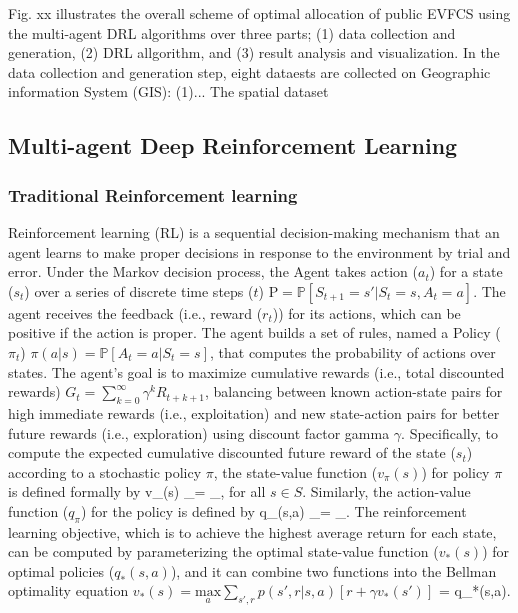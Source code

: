 \documentclass[preprint,12pt]{elsarticle}
\begin{document}
\vspace{5pt}

Fig. xx illustrates the overall scheme of optimal allocation of public EVFCS using the multi-agent DRL algorithms over three parts; (1) data collection and generation, (2) DRL allgorithm, and (3) result analysis and visualization. In the data collection and generation step, eight dataests are collected on Geographic information System (GIS): (1)... The spatial dataset 

\subsection{Multi-agent Deep Reinforcement Learning}

\subsubsection{Traditional Reinforcement learning}
Reinforcement learning (RL) is a sequential decision-making mechanism that an agent learns to make proper decisions in response to the environment by trial and error. Under the Markov decision process, the Agent takes action ($a_t$) for a state ($s_t$) over a series of discrete time steps ($t$) $\mathrm{P}=\mathbb{P}[S_{t+1}=s'|S_t=s, A_t=a]$. The agent receives the feedback (i.e., reward ($r_t$)) for its actions, which can be positive if the action is proper. The agent builds a set of rules, named a Policy ($\pi_t$) $\pi(a|s) = \mathbb{P}[A_t=a|S_t=s]$, that computes the probability of actions over states. The agent's goal is to maximize cumulative rewards (i.e., total discounted rewards) $G_t=\sum_{k=0}^{\infty}\gamma^kR_{t+k+1}$, balancing between known action-state pairs for high immediate rewards (i.e., exploitation) and new state-action pairs for better future rewards (i.e., exploration) using discount factor gamma $\gamma$. Specifically, to compute the expected cumulative discounted future reward of the state ($s_t$) according to a stochastic policy $\pi$, the state-value function ($v_\pi(s)$) for policy $\pi$ is defined formally by v_\pi(s) \doteq {}_\pi[G_t|S_t=s] = _\pi\left[ \sum_{k=0}^{\infty } \gamma^kR_{t+k+1} | S_t=s \right], for all $s \in S$. Similarly, the action-value function ($q_\pi$) for the policy is defined by q_\pi(s,a) \doteq {}_\pi[G_t|S_t=s, A_t=a] = _\pi\left[ \sum_{k=0}^{\infty } \gamma^kR_{t+k+1} | S_t=s, A_t=a \right]. The reinforcement learning objective, which is to achieve the highest average return for each state, can be computed by parameterizing the optimal state-value function ($v_*(s)$) for optimal policies ($q_*(s,a)$), and it can combine two functions into the Bellman optimality equation $v_*(s) = \underset{a}{\mathrm{max}}\sum_{s',r}p(s',r|s,a)[r+\gamma v_*(s')]$ = q_*(s,a).
\end{document}
